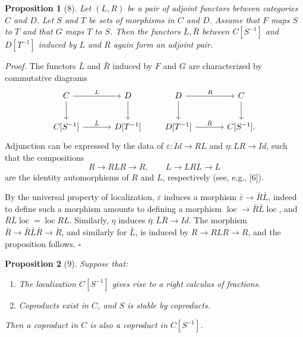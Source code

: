 \documentclass[11pt]{article}
\theoremstyle{deligne}
\newtheorem*{proposition*}{Proposition}
\newenvironment{proofdel}{\noindent\textit{Proof.}}{\hfill$\square$}
\begin{document}
\begin{proposition*}[8]
Let \((L,R)\) be a pair of adjoint functors between categories \(C\) and \(D\). Let \(S\) and \(T\) be sets of morphisms in \(C\) and \(D\). Assume that \(F\) maps \(S\) to \(T\) and that \(G\) maps \(T\) to \(S\). Then the functors \(\bar L,\bar R\) between \(C[S^{-1}]\) and \(D[T^{-1}]\) induced by \(L\) and \(R\) again form an adjoint pair.
\end{proposition*}

\begin{proofdel}
The functors \(\bar L\) and \(\bar R\) induced by \(F\) and \(G\) are characterized by commutative diagrams
\[
\begin{tikzcd}[column sep=3.4em,row sep=2.2em]
C \arrow[r,"L"] \arrow[d] & D \arrow[d]\\
C[S^{-1}] \arrow[r,"\bar L"] & D[T^{-1}]
\end{tikzcd}
\qquad
\begin{tikzcd}[column sep=3.4em,row sep=2.2em]
D \arrow[r,"R"] \arrow[d] & C \arrow[d]\\
D[T^{-1}] \arrow[r,"\bar R"] & C[S^{-1}].
\end{tikzcd}
\]
Adjunction can be expressed by the data of \(\varepsilon:Id\to RL\) and \(\eta:LR\to Id\), such that the compositions
\[
R\longrightarrow RLR\longrightarrow R,\qquad
L\longrightarrow LRL\longrightarrow L
\]
are the identity automorphisms of \(R\) and \(L\), respectively (see, e.g., [6]).

By the universal property of localization, \(\varepsilon\) induces a morphism \(\bar\varepsilon\to\bar R\bar L\), indeed to define such a morphism amounts to defining a morphism \(\operatorname{loc}\to\bar R\bar L\operatorname{loc}\), and \(\bar R\bar L\operatorname{loc}=\operatorname{loc}RL\). Similarly, \(\eta\) induces \(\bar\eta:\bar L\bar R\to Id\). The morphism \(\bar R\to\bar R\bar L\bar R\to\bar R\), and similarly for \(\bar L\), is induced by \(R\to RLR\to R\), and the proposition follows.
\end{proofdel}

\begin{proposition*}[9]
Suppose that:
\begin{enumerate}[label=\arabic*.]
\item The localization \(C[S^{-1}]\) gives rise to a right calculus of fractions.
\item Coproducts exist in \(C\), and \(S\) is stable by coproducts.
\end{enumerate}
Then a coproduct in \(C\) is also a coproduct in \(C[S^{-1}]\).
\end{proposition*}
\end{document}
